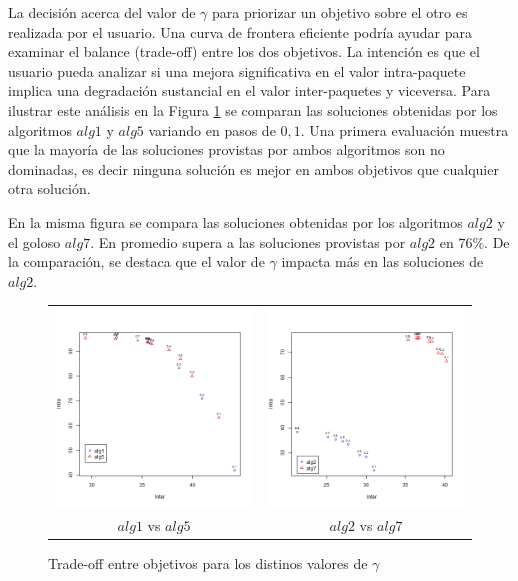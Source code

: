 La decisión acerca del valor de $\gamma$ para priorizar un objetivo sobre el otro es realizada por el usuario. Una curva de frontera eficiente podría ayudar para examinar el balance (trade-off) entre los dos objetivos. La intención es que el usuario pueda analizar si una mejora significativa en el valor intra-paquete implica una degradación sustancial en el valor inter-paquetes y viceversa. Para ilustrar este análisis en la Figura \ref{res:inter_intra} se comparan las soluciones obtenidas por los algoritmos $alg1$ y $alg5$ variando en pasos de $0,1$. Una primera evaluación muestra que la mayoría de las soluciones provistas por ambos algoritmos son no dominadas, es decir ninguna solución es mejor en ambos objetivos que cualquier otra solución.

En la misma figura se compara las soluciones obtenidas por los algoritmos $alg2$ y el goloso $alg7$. En promedio supera a las soluciones provistas por $alg2$ en $76\%$. De la comparación, se destaca que el valor de $\gamma$ impacta más en las soluciones de $alg2$.  

\begin{figure}[H]
	\centering
	\begin{tabular}{cc}
			\includegraphics[width=0.5\linewidth]{img/alg1_vs_alg5.png}&
			\includegraphics[width=0.5\linewidth]{img/alg2_vs_alg7.png}\\
			$alg1$ vs $alg5$ & $alg2$ vs $alg7$\\
	\end{tabular}
	\caption{Trade-off entre objetivos para los distinos valores de $\gamma$}
	\label{res:inter_intra}
\end{figure}

